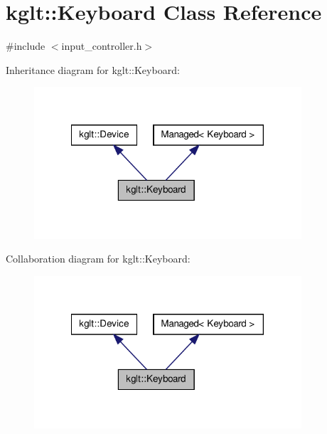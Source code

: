 \hypertarget{classkglt_1_1_keyboard}{\section{kglt\-:\-:Keyboard Class Reference}
\label{classkglt_1_1_keyboard}
}


{\ttfamily \#include $<$input\-\_\-controller.\-h$>$}



Inheritance diagram for kglt\-:\-:Keyboard\-:\nopagebreak
\begin{figure}[H]
\begin{center}
\leavevmode
\includegraphics[width=282pt]{classkglt_1_1_keyboard__inherit__graph}
\end{center}
\end{figure}


Collaboration diagram for kglt\-:\-:Keyboard\-:\nopagebreak
\begin{figure}[H]
\begin{center}
\leavevmode
\includegraphics[width=282pt]{classkglt_1_1_keyboard__coll__graph}
\end{center}
\end{figure}
